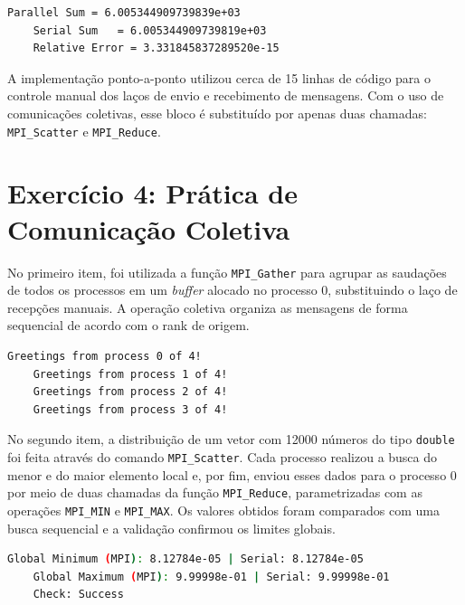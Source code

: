 \documentclass[a4paper, 12pt]{article}
\begin{document}
\begin{lstlisting}[language=bash, caption={Saída da soma paralela}, basicstyle=\ttfamily\footnotesize]
    Parallel Sum = 6.005344909739839e+03
    Serial Sum   = 6.005344909739819e+03
    Relative Error = 3.331845837289520e-15
\end{lstlisting}

A implementação ponto-a-ponto utilizou cerca de 15 linhas de código para o controle manual dos laços de envio e recebimento de mensagens. Com o uso de comunicações coletivas, esse bloco é substituído por apenas duas chamadas: \verb|MPI_Scatter| e \verb|MPI_Reduce|.

\section{Exercício 4: Prática de Comunicação Coletiva}

No primeiro item, foi utilizada a função \verb|MPI_Gather| para agrupar as saudações de todos os processos em um \textit{buffer} alocado no processo 0, substituindo o laço de recepções manuais. A operação coletiva organiza as mensagens de forma sequencial de acordo com o rank de origem.

\begin{lstlisting}[language=bash, caption={Saída do hello\_gather}, basicstyle=\ttfamily\footnotesize]
    Greetings from process 0 of 4!
    Greetings from process 1 of 4!
    Greetings from process 2 of 4!
    Greetings from process 3 of 4!
\end{lstlisting}

No segundo item, a distribuição de um vetor com 12000 números do tipo \verb|double| foi feita através do comando \verb|MPI_Scatter|. Cada processo realizou a busca do menor e do maior elemento local e, por fim, enviou esses dados para o processo 0 por meio de duas chamadas da função \verb|MPI_Reduce|, parametrizadas com as operações \verb|MPI_MIN| e \verb|MPI_MAX|. Os valores obtidos foram comparados com uma busca sequencial e a validação confirmou os limites globais.

\begin{lstlisting}[language=bash, caption={Saída do minmax}, basicstyle=\ttfamily\footnotesize]
    Global Minimum (MPI): 8.12784e-05 | Serial: 8.12784e-05
    Global Maximum (MPI): 9.99998e-01 | Serial: 9.99998e-01
    Check: Success
\end{lstlisting}
\end{document}
